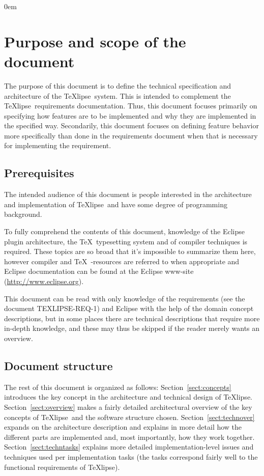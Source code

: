 \documentclass[a4paper,11pt,twoside]{article}
\newcommand{\texlipse}{\TeX lipse}
\begin{document}

\parindent 0em
\parskip 10pt

\section{Purpose and scope of the document}

The purpose of this document is to define the technical specification and 
architecture of the \texlipse\ system. This is intended to complement the 
\texlipse\ requirements documentation. Thus, this document focuses primarily on 
specifying how features are to be implemented and why they are implemented in 
the specified way. Secondarily, this document focuses on defining feature 
behavior more specifically than done in the requirements document when that is 
necessary for implementing the requirement.

\subsection{Prerequisites}

The intended audience of this document is people interested in the architecture 
and implementation of \texlipse\ and have some degree of programming background.

To fully comprehend the contents of this document, knowledge of the Eclipse 
plugin architecture, the \TeX\ typesetting system and of compiler techniques is 
required. These topics are so broad that it's impossible to summarize them 
here, however compiler and \TeX\ -resources are referred to when appropriate 
and Eclipse documentation can be found at the Eclipse www-site 
\mbox{(\url{http://www.eclipse.org})}.

This document can be read with only knowledge of the requirements (see the 
document TEXLIPSE-REQ-1) and Eclipse with the help of the domain concept 
descriptions, but in some places there are technical descriptions that require 
more in-depth knowledge, and these may thus be skipped if the reader merely 
wants an overview.

\subsection{Document structure}

The rest of this document is organized as follows: Section~\ref{sect:concepts} 
introduces the key concept in the architecture and technical design of 
\texlipse. Section~\ref{sect:overview} makes a fairly detailed architectural 
overview of the key concepts of \texlipse\ and the software structure chosen. 
Section~\ref{sect:technover} expands on the architecture description and 
explains in more detail how the different parts are implemented and, most 
importantly, how they work together. Section~\ref{sect:techntasks} explains 
more detailed implementation-level issues and techniques used per 
implementation tasks (the tasks correspond fairly well to the functional 
requirements of \texlipse).
\end{document}

